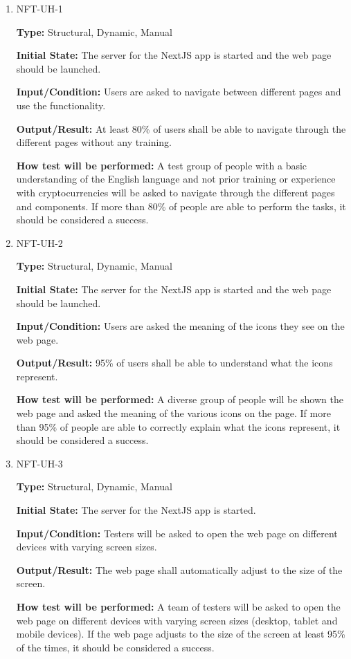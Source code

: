 \documentclass[12pt, titlepage]{article}
\begin{document}
\begin{enumerate}

\item{NFT-UH-1}

\textbf{Type:} Structural, Dynamic, Manual

\textbf{Initial State:} The server for the NextJS app is started and the web page should be launched.
    
\textbf{Input/Condition:} Users are asked to navigate between different pages and use the functionality.

\textbf{Output/Result:} At least 80\% of users shall be able to navigate through the different pages without any training.

\textbf{How test will be performed:} A test group of people with a basic understanding of the English language and not prior training or experience with cryptocurrencies will be asked to navigate through the different pages and components. If more than 80\% of people are able to perform the tasks, it should be considered a success.

\item{NFT-UH-2}

\textbf{Type:} Structural, Dynamic, Manual

\textbf{Initial State:} The server for the NextJS app is started and the web page should be launched.
    
\textbf{Input/Condition:} Users are asked the meaning of the icons they see on the web page.

\textbf{Output/Result:} 95\% of users shall be able to understand what the icons represent.

\textbf{How test will be performed:} A diverse group of people will be shown the web page and asked the meaning of the various icons on the page. If more than 95\% of people are able to correctly explain what the icons represent, it should be considered a success.

\item{NFT-UH-3}

\textbf{Type:} Structural, Dynamic, Manual

\textbf{Initial State:} The server for the NextJS app is started.
    
\textbf{Input/Condition:} Testers will be asked to open the web page on different devices with varying screen sizes.

\textbf{Output/Result:} The web page shall automatically adjust to the size of the screen.

\textbf{How test will be performed:} A team of testers will be asked to open the web page on different devices with varying screen sizes (desktop, tablet and mobile devices). If the web page adjusts to the size of the screen at least 95\% of the times, it should be considered a success.
					
\end{enumerate}
\end{document}
